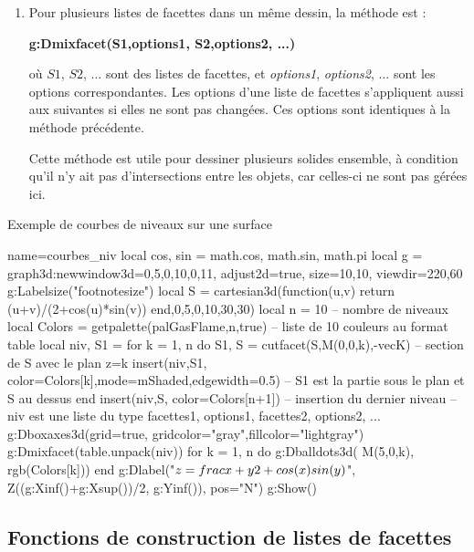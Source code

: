 \begin{enumerate}
\begin{itemize}
    \end{itemize}
    \item Pour plusieurs listes de facettes dans un même dessin, la méthode est :
        \par\hfil\textbf{g:Dmixfacet(S1,options1, S2,options2, ...)}\hfil\par
    où $S1$, $S2$, ... sont des listes de facettes, et \emph{options1}, \emph{options2}, ... sont les options correspondantes. Les options d'une liste de facettes s'appliquent aussi aux suivantes si elles ne sont pas changées. Ces options sont identiques à la méthode précédente.
    
    Cette méthode est utile pour dessiner plusieurs solides ensemble, à condition qu'il n'y ait pas d'intersections entre les objets, car celles-ci ne sont pas gérées ici.
\end{enumerate}

\begin{demo}[courbeniv]{Exemple de courbes de niveaux sur une surface}
\begin{luadraw}{name=courbes_niv}
local cos, sin = math.cos, math.sin, math.pi
local g = graph3d:new{window3d={0,5,0,10,0,11}, adjust2d=true, size={10,10}, viewdir={220,60}}
g:Labelsize("footnotesize")
local S = cartesian3d(function(u,v) return (u+v)/(2+cos(u)*sin(v)) end,0,5,0,10,{30,30})
local n = 10 -- nombre de niveaux
local Colors = getpalette(palGasFlame,n,true) -- liste de 10 couleurs au format table
local niv, S1 = {}
for k = 1, n do
    S1, S = cutfacet(S,{M(0,0,k),-vecK}) -- section de S avec le plan z=k
    insert(niv,{S1, {color=Colors[k],mode=mShaded,edgewidth=0.5}}) -- S1 est la partie sous le plan et S au dessus
end
insert(niv,{S, {color=Colors[n+1]}}) -- insertion du dernier niveau
-- niv est une liste du type {facettes1, options1, facettes2, options2, ...}
g:Dboxaxes3d({grid=true, gridcolor="gray",fillcolor="lightgray"})
g:Dmixfacet(table.unpack(niv))
for k = 1, n do
    g:Dballdots3d( M(5,0,k), rgb(Colors[k]))
end
g:Dlabel("$z=\\frac{x+y}{2+\\cos(x)\\sin(y)}$", Z((g:Xinf()+g:Xsup())/2, g:Yinf()), {pos="N"})
g:Show()
\end{luadraw}
\end{demo}

\subsection{Fonctions de construction de listes de facettes}

